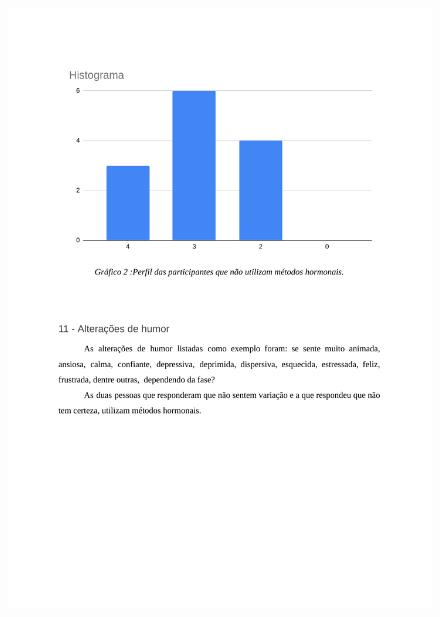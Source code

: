 \begin{apendicesenv}
    \begin{figure}[h]
        \centering
        \includegraphics[keepaspectratio=true,scale=0.7]{figuras/Tab9.pdf}
    \end{figure}
    

\end{apendicesenv}
